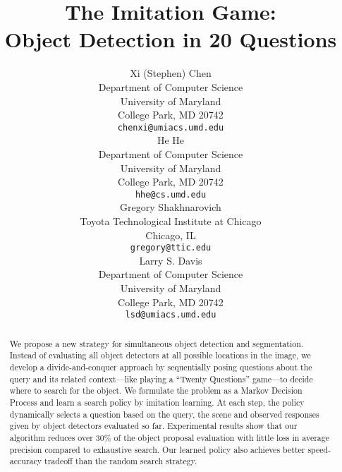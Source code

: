 \documentclass{article} %
\title{The Imitation Game:\\ Object Detection in 20 Questions}
\author{
Xi (Stephen) Chen\\
Department of Computer Science\\
University of Maryland\\
College Park, MD 20742 \\
\texttt{chenxi@umiacs.umd.edu} \\
\AND
He He \\
Department of Computer Science\\
University of Maryland\\
College Park, MD 20742 \\
\texttt{hhe@cs.umd.edu} \\
\And
Gregory Shakhnarovich\\
Toyota Technological Institute at Chicago \\
Chicago, IL\\
\texttt{gregory@ttic.edu} \\
\And
Larry S. Davis \\
Department of Computer Science\\
University of Maryland\\
College Park, MD 20742 \\
\texttt{lsd@umiacs.umd.edu} 
}
\theoremstyle{definition}
\begin{document}
\maketitle

\begin{abstract}
We propose a new strategy for simultaneous object detection and segmentation. Instead of evaluating all object detectors at all possible locations in the
image, we develop a divide-and-conquer approach by sequentially posing questions about the query and its related context---like playing a ``Twenty Questions'' game---to decide where to search for the object. We formulate the problem as a Markov Decision Process and learn a search policy by imitation learning. At each step, the policy dynamically selects a question based on the query, the scene and observed responses given by object detectors evaluated so far.
Experimental results show that our
algorithm reduces over 30\% of the object proposal evaluation with little loss in average precision compared to exhaustive search. 
Our learned policy also achieves better speed-accuracy tradeoff than the random search strategy.
\end{abstract}






% 






{\small


}
\end{document}
